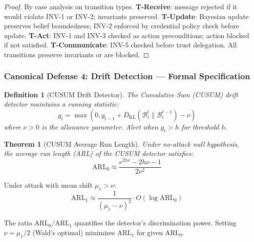 \documentclass[
]{article}
\newtheorem{definition}{Definition}[section]
\newtheorem{theorem}{Theorem}[section]
\begin{document}
\begin{proof}
By case analysis on transition types. \textbf{T-Receive}: message rejected if it would violate INV-1 or INV-2; invariants preserved. \textbf{T-Update}: Bayesian update preserves belief boundedness; INV-2 enforced by credential policy check before update. \textbf{T-Act}: INV-1 and INV-3 checked as action preconditions; action blocked if not satisfied. \textbf{T-Communicate}: INV-5 checked before trust delegation. All transitions preserve invariants or are blocked.
\end{proof}

\subsubsection{Canonical Defense 4: Drift Detection --- Formal
Specification}\label{canonical-defense-4-drift-detection-formal-specification}

\begin{definition}[CUSUM Drift Detector]
\label{def:cusum-detector}
The Cumulative Sum (CUSUM) drift detector \cite{page1954continuous} maintains a running statistic:
\begin{equation}
\label{eq:cusum}
g_t = \max(0, g_{t-1} + D_{\mathrm{KL}}(\mathcal{B}_i^t \| \mathcal{B}_i^{t-1}) - \nu)
\end{equation}
where $\nu > 0$ is the allowance parameter. Alert when $g_t > h$ for threshold $h$.
\end{definition}

\begin{theorem}[CUSUM Average Run Length]
\label{thm:cusum-arl}
Under no-attack null hypothesis, the average run length (ARL) of the CUSUM detector satisfies:
\begin{equation}
\label{eq:cusum-arl}
\text{ARL}_0 \approx \frac{e^{2h\nu} - 2h\nu - 1}{2\nu^2}
\end{equation}
\end{theorem}

Under attack with mean shift \(\mu_1 > \nu\): \begin{equation}
\label{eq:cusum-arl1}
\text{ARL}_1 \approx \frac{1}{(\mu_1 - \nu)^2} \cdot O(\log \text{ARL}_0)
\end{equation}

The ratio \(\text{ARL}_0 / \text{ARL}_1\) quantifies the detector's
discrimination power. Setting \(\nu = \mu_1/2\) (Wald's optimal)
minimizes \(\text{ARL}_1\) for given \(\text{ARL}_0\).
\end{document}

